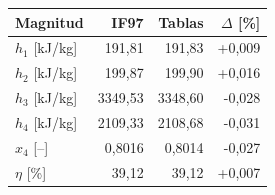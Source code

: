 \begin{tabular}{lrrr}
\toprule
Magnitud & IF97 & Tablas & $\Delta$ [\%]\\
\midrule
$h_1$ [kJ/kg] & 191,81 & 191,83 & +0,009 \\
$h_2$ [kJ/kg] & 199,87 & 199,90 & +0,016 \\
$h_3$ [kJ/kg] & 3349,53 & 3348,60 & -0,028 \\
$h_4$ [kJ/kg] & 2109,33 & 2108,68 & -0,031 \\
$x_4$ [--] & 0,8016 & 0,8014 & -0,027 \\
$\eta$ [\%] & 39,12 & 39,12 & +0,007 \\
\bottomrule
\end{tabular}

